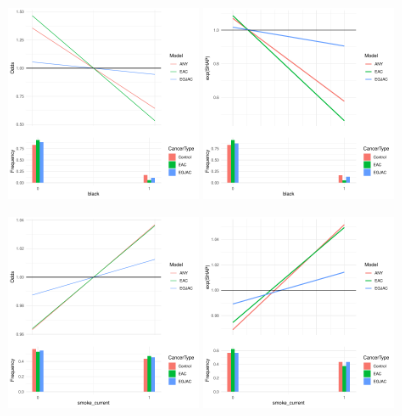\documentclass[12pt]{article}
\begin{document}
\begin{figure}[h]
\centering
\includegraphics[width=0.45\textwidth]{pdp/black.pdf}
\includegraphics[width=0.45\textwidth]{shap/black.pdf}
\end{figure}
\begin{figure}[h]
\centering
\includegraphics[width=0.45\textwidth]{pdp/smoke_current.pdf}
\includegraphics[width=0.45\textwidth]{shap/smoke_current.pdf}
\end{figure}
\end{document}

